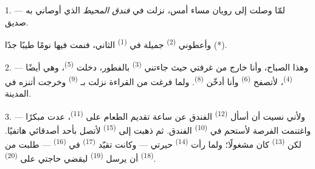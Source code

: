 %
%


\VUsaut{3.0mm}
\VUsaut{1.6mm}
\VUsaut{2.0mm}
\VUsaut{3.4mm}

1. --- لمّا وصلت إلى رويان مساء أمس، نزلت في \textit{فندق المحيط} الذي
أوصاني به صديق.

وأعطوني  \textsuperscript{(2)} جميلة في 
\textsuperscript{(1)} الثاني، فنمت فيها نومًا طيبًا جدًا (*).

2. --- وهذا الصباح، وأنا خارج من غرفتي حيث جاءتني 
\textsuperscript{(3)} بالفطور، دخلت  \textsuperscript{(5)}، وهي
أيضًا  \textsuperscript{(4)}، لأتصفح 
\textsuperscript{(6)} وأنا أدخّن  \textsuperscript{(8)}. ولما فرغت من
القراءة نزلت بـ \textsuperscript{(9)} وخرجت أتنزه في المدينة.

3. --- ولأني نسيت أن أسأل  \textsuperscript{(12)} الفندق عن ساعة
تقديم الطعام على  \textsuperscript{(11)}، عدت مبكرًا
واغتنمت الفرصة لأستحم في  \textsuperscript{(10)} الفندق. ثم ذهبت
إلى  \textsuperscript{(15)} لأتصل بأحد أصدقائي هاتفيًا. لكن
 \textsuperscript{(13)} كان مشغولًا؛ ولما رأت  \textsuperscript{(14)} حيرتي --- وكانت تقيّد 
\textsuperscript{(17)} في  \textsuperscript{(16)} --- طلبت من
 \textsuperscript{(18)} أن يرسل  \textsuperscript{(19)}
ليقضي حاجتي على  \textsuperscript{(20)}.

